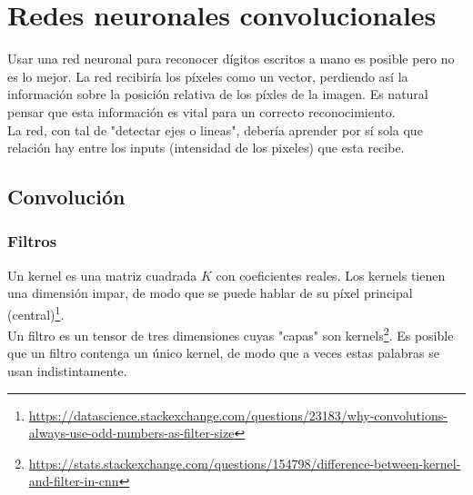 \documentclass{article}
\begin{document}
\section{Redes neuronales convolucionales}

Usar una red neuronal para reconocer dígitos escritos a mano es posible pero no es lo mejor. La red recibiría los píxeles como un vector, perdiendo así la información sobre la posición relativa de los píxles de la imagen. Es natural pensar que esta información es vital para un correcto reconocimiento.\\

La red, con tal de "detectar ejes o lineas", debería aprender por sí sola que relación hay entre los inputs (intensidad de los pixeles) que esta recibe.\\

\subsection{Convolución}

\subsubsection{Filtros}
Un kernel es una matriz cuadrada $K$ con coeficientes reales. Los kernels tienen una dimensión impar, de modo que se puede hablar de su píxel principal (central)\footnote{\url{https://datascience.stackexchange.com/questions/23183/why-convolutions-always-use-odd-numbers-as-filter-size}}.\\

Un filtro es un tensor de tres dimensiones cuyas "capas" son kernels\footnote{\url{https://stats.stackexchange.com/questions/154798/difference-between-kernel-and-filter-in-cnn}}. Es posible que un filtro contenga un único kernel, de modo que a veces  estas palabras se usan indistintamente.\\
\end{document}
